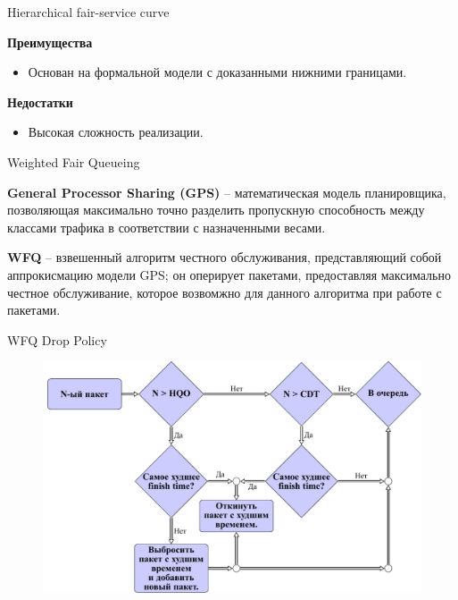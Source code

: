\documentclass[12pt]{beamer}
\begin{document}
\begin{frame}{Hierarchical fair-service curve}
	\begin{center}
    {\footnotesize
            \begin{multicols}{2}
				{\bf Преимущества}
				\begin{itemize}
					\item Основан на формальной модели с доказанными нижними границами.
				\end{itemize}
            \columnbreak
				{\bf Недостатки}
				\begin{itemize}
					\item Высокая сложность реализации.
				\end{itemize}
            \end{multicols}
        }
	\end{center}
\end{frame}

\begin{frame}{Weighted Fair Queueing}
	

	\textbf{General Processor Sharing (GPS)} -- математическая модель
	планировщика, позволяющая максимально точно разделить пропускную
	способность между классами трафика в соответствии с назначенными
	весами.

	\textbf{WFQ} -- взвешенный алгоритм честного обслуживания,
	представляющий собой аппрокисмацию модели GPS; он оперирует
	пакетами, предоставляя максимально честное обслуживание,
	которое возвомжно для данного алгоритма при работе с пакетами.

\end{frame}

\begin{frame}{WFQ Drop Policy}
	\begin{figure}
		\center
    	\includegraphics[scale=0.6]{../text/src/pdfimages/fwfq_drop.pdf}
	\end{figure}
\end{frame}
\end{document}
